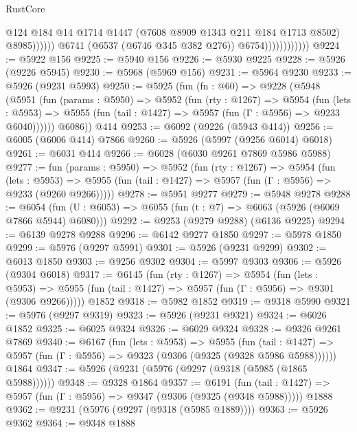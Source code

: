 \begin{lexlean}{RustCore}
\begin{coremodule}
                                        @124
                                        @184
                                        @14
                                        @1714
                                        @1447
                                        (@7608 @8909 @1343 @211 @184 @1713 @8502)
                                        @8985))))))
                            @6741
                            (@6537 (@6746 @345 @382 @276))
                            @6754))))))))))))
@9224 := @5922 @156
@9225 := @5940 @156
@9226 := @5930 @9225
@9228 := @5926 (@9226 @5945)
@9230 := @5968 (@5969 @156)
@9231 := @5964 @9230
@9233 := @5926 (@9231 @5993)
@9250 := @5925
    (fun (fn : @60) =>
    @9228
      (@5948
        (@5951
          (fun (params : @5950) =>
          @5952
            (fun (rty : @1267) =>
            @5954
              (fun (lets : @5953) =>
              @5955 (fun (tail : @1427) => @5957 (fun (Γ : @5956) => @9233 @6040))))))
        @6086))
    @414
@9253 := @6092 (@9226 (@5943 @414))
@9256 := @6005 (@6006 @414) @7866
@9260 := @5926 (@5997 (@9256 @6014) @6018)
@9261 := @6031 @414
@9266 := @6028 (@6030 @9261 @7869 @5986 @5988)
@9277 := fun (params : @5950) =>
  @5952
    (fun (rty : @1267) =>
    @5954
      (fun (lets : @5953) =>
      @5955 (fun (tail : @1427) => @5957 (fun (Γ : @5956) => @9233 (@9260 @9266)))))
@9278 := @5951 @9277
@9279 := @5948 @9278
@9288 := @6054 (fun (U : @6053) => @6055 (fun (t : @7) => @6063 (@5926 (@6069 @7866 @5944) @6080)))
@9292 := @9253 (@9279 @9288) (@6136 @9225)
@9294 := @6139 @9278 @9288
@9296 := @6142 @9277 @1850
@9297 := @5978 @1850
@9299 := @5976 (@9297 @5991)
@9301 := @5926 (@9231 @9299)
@9302 := @6013 @1850
@9303 := @9256 @9302
@9304 := @5997 @9303
@9306 := @5926 (@9304 @6018)
@9317 := @6145
    (fun (rty : @1267) =>
    @5954
      (fun (lets : @5953) =>
      @5955 (fun (tail : @1427) => @5957 (fun (Γ : @5956) => @9301 (@9306 @9266)))))
    @1852
@9318 := @5982 @1852
@9319 := @9318 @5990
@9321 := @5976 (@9297 @9319)
@9323 := @5926 (@9231 @9321)
@9324 := @6026 @1852
@9325 := @6025 @9324
@9326 := @6029 @9324
@9328 := @9326 @9261 @7869
@9340 := @6167
    (fun (lets : @5953) =>
    @5955
      (fun (tail : @1427) => @5957 (fun (Γ : @5956) => @9323 (@9306 (@9325 (@9328 @5986 @5988))))))
    @1864
@9347 := @5926 (@9231 (@5976 (@9297 (@9318 (@5985 (@1865 @5988))))))
@9348 := @9328 @1864
@9357 := @6191
    (fun (tail : @1427) => @5957 (fun (Γ : @5956) => @9347 (@9306 (@9325 (@9348 @5988)))))
    @1888
@9362 := @9231 (@5976 (@9297 (@9318 (@5985 @1889))))
@9363 := @5926 @9362
@9364 := @9348 @1888

\end{coremodule}
\end{lexlean}
